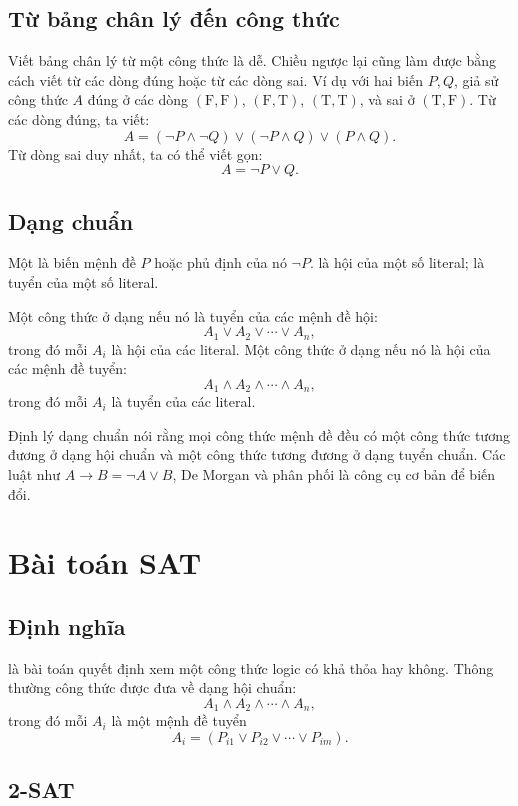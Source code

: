 \documentclass[11pt]{article}
\newcommand{\True}{\mathrm{T}}
\newcommand{\False}{\mathrm{F}}
\begin{document}
\subsection{Từ bảng chân lý đến công thức}

Viết bảng chân lý từ một công thức là dễ. Chiều ngược lại cũng làm được bằng
cách viết từ các dòng đúng hoặc từ các dòng sai. Ví dụ với hai biến \(P,Q\),
giả sử công thức \(A\) đúng ở các dòng \((\False,\False)\),
\((\False,\True)\), \((\True,\True)\), và sai ở
\((\True,\False)\). Từ các dòng đúng, ta viết:
\[
  A=(\neg P\land\neg Q)\lor(\neg P\land Q)\lor(P\land Q).
\]
Từ dòng sai duy nhất, ta có thể viết gọn:
\[
  A=\neg P\lor Q.
\]

\subsection{Dạng chuẩn}

Một  là biến mệnh đề \(P\) hoặc phủ định của nó \(\neg P\).
 là hội của một số literal;  là tuyển
của một số literal.

Một công thức ở dạng  nếu nó là tuyển của các mệnh đề hội:
\[
  A_1\lor A_2\lor\cdots\lor A_n,
\]
trong đó mỗi \(A_i\) là hội của các literal. Một công thức ở dạng
 nếu nó là hội của các mệnh đề tuyển:
\[
  A_1\land A_2\land\cdots\land A_n,
\]
trong đó mỗi \(A_i\) là tuyển của các literal.

Định lý dạng chuẩn nói rằng mọi công thức mệnh đề đều có một công thức tương
đương ở dạng hội chuẩn và một công thức tương đương ở dạng tuyển chuẩn. Các
luật như \(A\to B=\neg A\lor B\), De Morgan và phân phối là công cụ cơ bản để
biến đổi.

\section{Bài toán SAT}

\subsection{Định nghĩa}

 là bài toán quyết định xem một công thức logic có khả thỏa hay
không. Thông thường công thức được đưa về dạng hội chuẩn:
\[
  A_1\land A_2\land\cdots\land A_n,
\]
trong đó mỗi \(A_i\) là một mệnh đề tuyển
\[
  A_i=(P_{i1}\lor P_{i2}\lor\cdots\lor P_{im}).
\]

\subsection{2-SAT}
\end{document}
